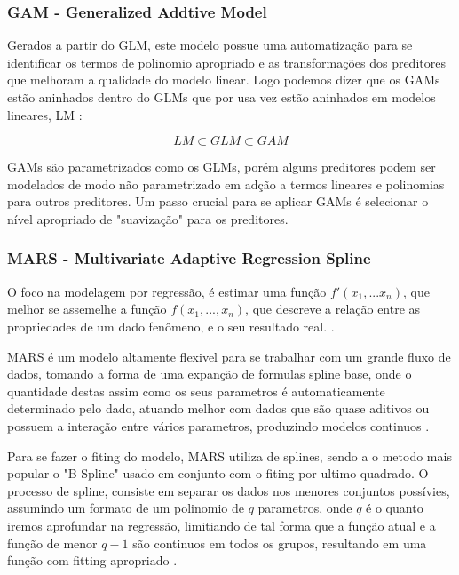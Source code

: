 \documentclass[
	12pt,				%
	openright,			%
	oneside,			%
	a4paper,			%
	english,			%
	brazil				%
	]{abntex2}
\begin{document}
\subsubsection{GAM - Generalized Addtive Model}

Gerados a partir do GLM, este modelo possue uma automatização para se identificar os termos de polinomio apropriado
e as transformações dos preditores que melhoram a qualidade do modelo linear. Logo podemos dizer que os GAMs estão
aninhados dentro do GLMs que por usa vez estão aninhados em modelos lineares, LM \cite{GAMeGLM_especie_estudo}:

\begin{equation}
	LM \subset GLM \subset GAM
\end{equation}

GAMs são parametrizados como os GLMs, porém alguns preditores podem ser modelados de modo não parametrizado em 
adção a termos lineares e polinomias para outros preditores. Um passo crucial para se aplicar GAMs é selecionar
o nível apropriado de "suavização" para os preditores.

\subsubsection{MARS - Multivariate Adaptive Regression Spline}

O foco na modelagem por regressão, é estimar uma função $f'(x_1,...x_n)$, que melhor se assemelhe a função 
$f(x_1,...,x_n)$, que descreve a relação entre as propriedades de um dado fenômeno, e o seu resultado real.
\cite{MARS}. 

MARS é um modelo altamente flexivel para se trabalhar com um grande fluxo de dados, tomando a forma de uma expanção
de formulas spline base, onde o quantidade destas assim como os seus parametros é automaticamente determinado
pelo dado, atuando melhor com dados que são quase aditivos ou possuem a interação entre vários parametros,
produzindo modelos continuos \cite{intro_mars}.

Para se fazer o fiting do modelo, MARS utiliza de splines, sendo a o metodo mais popular o "B-Spline" usado em
conjunto com o fiting por ultimo-quadrado. O processo de spline, consiste em separar os dados nos
menores conjuntos possívies, assumindo um formato de um polinomio de $q$ parametros, onde $q$ é o quanto iremos
aprofundar na regressão, limitiando de tal forma que a função atual e a função de menor $q-1$ são continuos em
todos os grupos, resultando em uma função com fitting apropriado \cite{intro_mars}. 
\end{document}
